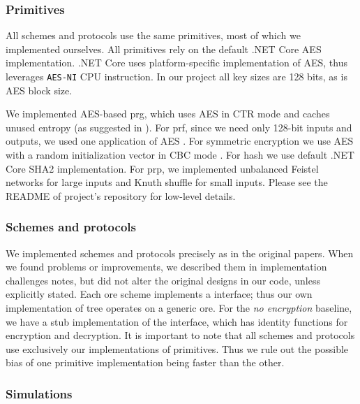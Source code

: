 		\subsubsection{Primitives}

			All schemes and protocols use the same primitives, most of which we implemented ourselves.
			All primitives rely on the default {.NET Core} AES implementation.
			{.NET Core} uses platform-specific implementation of AES, thus leverages \texttt{AES-NI} CPU instruction.
			In our project all key sizes are 128 bits, as is AES block size.

			We implemented AES-based \acrshort{prg}, which uses AES in CTR mode and caches unused entropy (as suggested in \cite{aes-ctr-rfc}).
			For \acrshort{prf}, since we need only 128-bit inputs and outputs, we used one application of AES \cite[Proposition 3.27]{intro-to-modern-crypto}.
			For symmetric encryption we use AES with a random initialization vector in CBC mode \cite[Section 3.6.2]{intro-to-modern-crypto}.
			For hash we use default {.NET Core} SHA2 implementation.
			For \acrshort{prp}, we implemented unbalanced Feistel networks \cite{unbalanced-feistel} for large inputs and Knuth shuffle \cite{knuth-shuffle} for small inputs.
			Please see the README of project's repository \cite{ore-project} for low-level details.

		\subsubsection{Schemes and protocols}

			We implemented schemes and protocols precisely as in the original papers.
			When we found problems or improvements, we described them in implementation challenges notes, but did not alter the original designs in our code, unless explicitly stated.
			Each \acrshort{ore} scheme implements a {\Csharp} interface; thus our own implementation of {\BPlus} tree operates on a generic \acrshort{ore}.
			For the \emph{no encryption} baseline, we have a stub implementation of the interface, which has identity functions for encryption and decryption.
			It is important to note that all schemes and protocols use exclusively our implementations of primitives.
			Thus we rule out the possible bias of one primitive implementation being faster than the other.

			

		\subsubsection{Simulations}

